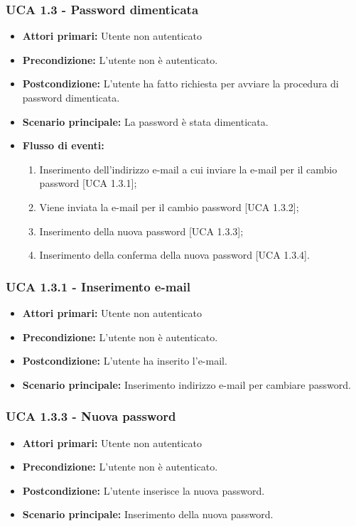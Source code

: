 \subsubsection{UCA 1.3 - Password dimenticata}%
\begin{itemize}
\item \textbf{Attori primari:} Utente non autenticato
\item \textbf{Precondizione:}  L'utente non è autenticato.
\item \textbf{Postcondizione:} L'utente ha fatto richiesta per avviare la procedura di password dimenticata.
\item \textbf{Scenario principale:} La password è stata dimenticata.
\item \textbf{Flusso di eventi:}
  \begin{enumerate}
        \item Inserimento dell'indirizzo e-mail a cui inviare la e-mail per il cambio password [UCA 1.3.1];
        \item Viene inviata la e-mail per il cambio password [UCA 1.3.2];
        \item Inserimento della nuova password [UCA 1.3.3];
        \item Inserimento della conferma della nuova password [UCA 1.3.4].
    \end{enumerate}
\end{itemize}

\subsubsection{UCA 1.3.1 - Inserimento e-mail}
\begin{itemize}
\item \textbf{Attori primari:} Utente non autenticato
\item \textbf{Precondizione:} L'utente non è autenticato.
\item \textbf{Postcondizione:} L'utente ha inserito l'e-mail.
\item \textbf{Scenario principale:} Inserimento indirizzo e-mail per cambiare password.
\end{itemize}


\subsubsection{UCA 1.3.3 - Nuova password}
\begin{itemize}
\item \textbf{Attori primari:} Utente non autenticato
\item \textbf{Precondizione:}  L'utente non è autenticato.
\item \textbf{Postcondizione:} L'utente inserisce la nuova password.
\item \textbf{Scenario principale:} Inserimento della nuova password.
\end{itemize}

